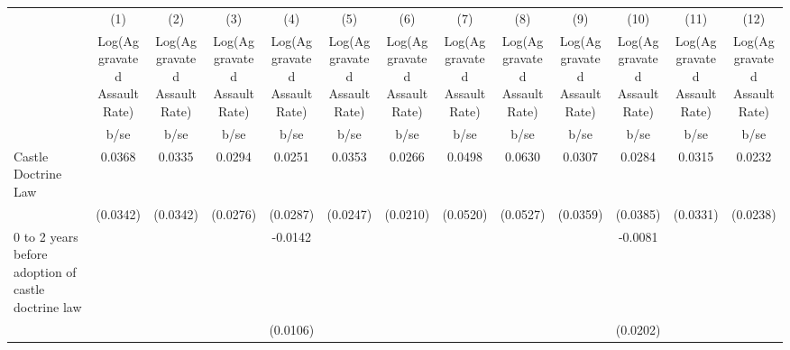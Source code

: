 {
\def\sym#1{\ifmmode^{#1}\else\(^{#1}\)\fi}
\begin{tabular}{l*{12}{c}}
\hline\hline
                    &\multicolumn{1}{c}{(1)}&\multicolumn{1}{c}{(2)}&\multicolumn{1}{c}{(3)}&\multicolumn{1}{c}{(4)}&\multicolumn{1}{c}{(5)}&\multicolumn{1}{c}{(6)}&\multicolumn{1}{c}{(7)}&\multicolumn{1}{c}{(8)}&\multicolumn{1}{c}{(9)}&\multicolumn{1}{c}{(10)}&\multicolumn{1}{c}{(11)}&\multicolumn{1}{c}{(12)}\\
                    &\multicolumn{1}{c}{Log(Aggravated Assault Rate)}&\multicolumn{1}{c}{Log(Aggravated Assault Rate)}&\multicolumn{1}{c}{Log(Aggravated Assault Rate)}&\multicolumn{1}{c}{Log(Aggravated Assault Rate)}&\multicolumn{1}{c}{Log(Aggravated Assault Rate)}&\multicolumn{1}{c}{Log(Aggravated Assault Rate)}&\multicolumn{1}{c}{Log(Aggravated Assault Rate)}&\multicolumn{1}{c}{Log(Aggravated Assault Rate)}&\multicolumn{1}{c}{Log(Aggravated Assault Rate)}&\multicolumn{1}{c}{Log(Aggravated Assault Rate)}&\multicolumn{1}{c}{Log(Aggravated Assault Rate)}&\multicolumn{1}{c}{Log(Aggravated Assault Rate)}\\
                    &        b/se         &        b/se         &        b/se         &        b/se         &        b/se         &        b/se         &        b/se         &        b/se         &        b/se         &        b/se         &        b/se         &        b/se         \\
\hline
Castle Doctrine Law &      0.0368         &      0.0335         &      0.0294         &      0.0251         &      0.0353         &      0.0266         &      0.0498         &      0.0630         &      0.0307         &      0.0284         &      0.0315         &      0.0232         \\
                    &    (0.0342)         &    (0.0342)         &    (0.0276)         &    (0.0287)         &    (0.0247)         &    (0.0210)         &    (0.0520)         &    (0.0527)         &    (0.0359)         &    (0.0385)         &    (0.0331)         &    (0.0238)         \\
0 to 2 years before adoption of castle doctrine law&                     &                     &                     &     -0.0142         &                     &                     &                     &                     &                     &     -0.0081         &                     &                     \\
                    &                     &                     &                     &    (0.0106)         &                     &                     &                     &                     &                     &    (0.0202)         &                     &                     \\

\end{tabular}}
